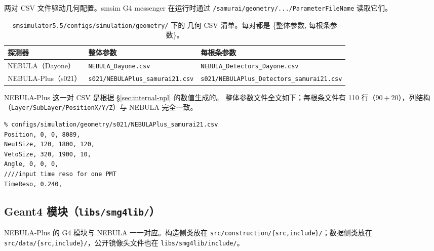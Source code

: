 \documentclass[a4paper,11pt]{ctexart}
\newcommand{\NEB}{NEBULA}
\newcommand{\NPL}{NEBULA-Plus}
\begin{document}
两对 CSV 文件驱动几何配置。smsim G4 messenger 在运行时通过
\texttt{/samurai/geometry/.../ParameterFileName} 读取它们。

\begin{table}[h]
\centering
\caption{\texttt{smsimulator5.5/configs/simulation/geometry/} 下的
几何 CSV 清单。每对都是 \{整体参数, 每根条参数\}。}
\begin{tabular}{lll}
\toprule
探测器 & 整体参数 & 每根条参数\\
\midrule
\NEB{}（Dayone） & \texttt{NEBULA\_Dayone.csv}           & \texttt{NEBULA\_Detectors\_Dayone.csv}\\
\NPL{}（s021）   & \texttt{s021/NEBULAPlus\_samurai21.csv}
                                                          & \texttt{s021/NEBULAPlus\_Detectors\_samurai21.csv}\\
\bottomrule
\end{tabular}
\end{table}

\NPL{} 这一对 CSV 是根据 \S\ref{sec:internal-npl} 的数值生成的。
整体参数文件全文如下；每根条文件有 110 行（$90+20$），列结构
（\texttt{Layer/SubLayer/PositionX/Y/Z}）与 \NEB{} 完全一致。

\begin{lstlisting}
% configs/simulation/geometry/s021/NEBULAPlus_samurai21.csv
Position, 0, 0, 8089,
NeutSize, 120, 1800, 120,
VetoSize, 320, 1900, 10,
Angle, 0, 0, 0,
////input time reso for one PMT
TimeReso, 0.240,
\end{lstlisting}

\subsection{Geant4 模块（\texttt{libs/smg4lib/}）}

\NPL{} 的 G4 模块与 \NEB{} 一一对应。构造侧类放在
\texttt{src/construction/\{src,include\}/}；数据侧类放在
\texttt{src/data/\{src,include\}/}，公开镜像头文件也在
\texttt{libs/smg4lib/include/}。
\end{document}
